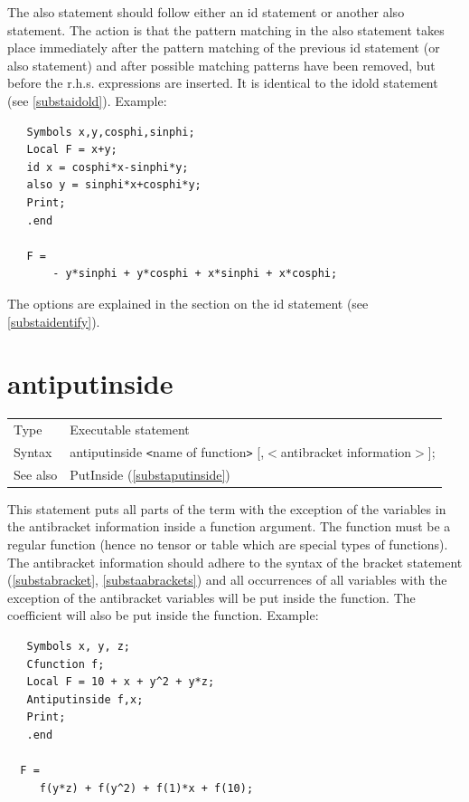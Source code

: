 \noindent The also statement should follow either an 
id statement or another also statement. The action is that the 
pattern matching in the also statement takes place immediately after the 
pattern matching of the previous id statement (or also statement) and after 
possible matching patterns have been removed, but before the r.h.s. 
expressions are inserted. It is identical to the idold statement (see 
\ref{substaidold}). Example:
\begin{verbatim}
   Symbols x,y,cosphi,sinphi;
   Local F = x+y;
   id x = cosphi*x-sinphi*y;
   also y = sinphi*x+cosphi*y;
   Print;
   .end

   F =
       - y*sinphi + y*cosphi + x*sinphi + x*cosphi;
\end{verbatim}

\noindent The options are explained in the section on the id statement (see 
\ref{substaidentify}). \vspace{10mm}


\section{antiputinside}
\label{substaantiputinside}

\noindent \begin{tabular}{ll}
Type & Executable statement\\
Syntax & antiputinside {\tt<}name of function{\tt>} [,$<$antibracket information$>$];
\\ See also & PutInside (\ref{substaputinside})
\end{tabular}\vspace{4mm}

\noindent This statement puts all parts of the term 
with the exception of the variables in the antibracket information inside a 
function argument. The function must be a regular function (hence no tensor 
or table which are special types of functions). The 
antibracket information should adhere to the syntax of 
the bracket statement (\ref{substabracket}, \ref{substaabrackets}) and all 
occurrences of all variables with the exception of the antibracket 
variables will be put inside the function. The coefficient will also be put 
inside the function. Example:
\begin{verbatim}
   Symbols x, y, z;
   Cfunction f;
   Local F = 10 + x + y^2 + y*z;
   Antiputinside f,x;
   Print;
   .end

  F =
     f(y*z) + f(y^2) + f(1)*x + f(10);
\end{verbatim}
\vspace{10mm}

